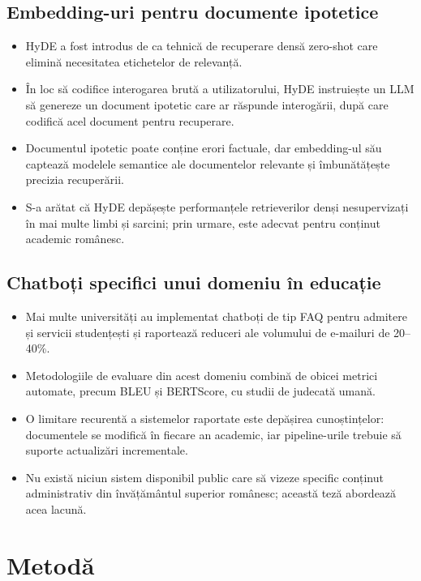 \documentclass[12pt,a4paper]{report}
\begin{document}
\section{Embedding-uri pentru documente ipotetice}
\begin{itemize}
    \item HyDE a fost introdus de \citet{Gao2022} ca tehnică de recuperare densă zero-shot care elimină necesitatea etichetelor de relevanță.
    \item În loc să codifice interogarea brută a utilizatorului, HyDE instruiește un LLM să genereze un document ipotetic care ar răspunde interogării, după care codifică acel document pentru recuperare.
    \item Documentul ipotetic poate conține erori factuale, dar embedding-ul său captează modelele semantice ale documentelor relevante și îmbunătățește precizia recuperării.
    \item S-a arătat că HyDE depășește performanțele retrieverilor denși nesupervizați în mai multe limbi și sarcini; prin urmare, este adecvat pentru conținut academic românesc.
\end{itemize}

\section{Chatboți specifici unui domeniu în educație}
\begin{itemize}
    \item Mai multe universități au implementat chatboți de tip FAQ pentru admitere și servicii studențești și raportează reduceri ale volumului de e-mailuri de 20--40\%.
    \item Metodologiile de evaluare din acest domeniu combină de obicei metrici automate, precum BLEU și BERTScore, cu studii de judecată umană.
    \item O limitare recurentă a sistemelor raportate este depășirea cunoștințelor: documentele se modifică în fiecare an academic, iar pipeline-urile trebuie să suporte actualizări incrementale.
    \item Nu există niciun sistem disponibil public care să vizeze specific conținut administrativ din învățământul superior românesc; această teză abordează acea lacună.
\end{itemize}


\chapter{Metodă}
\end{document}
